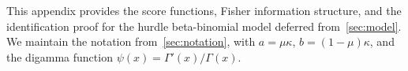 
This appendix provides the score functions, Fisher information structure,
and the identification proof for the hurdle beta-binomial model deferred
from~\cref{sec:model}. We maintain the notation from~\cref{sec:notation},
with $a = \mu\kappa$, $b = (1-\mu)\kappa$, and the digamma function
$\psi(x) = \Gamma'(x)/\Gamma(x)$.






